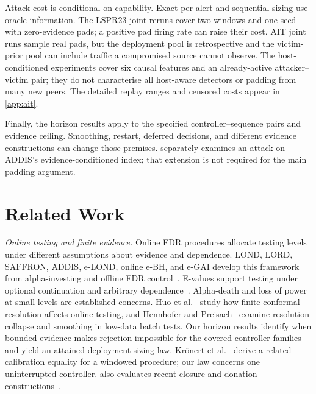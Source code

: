 \documentclass[conference]{IEEEtran}
\begin{document}
Attack cost is conditional on capability. Exact per-alert and sequential sizing use oracle
information. The LSPR23 joint reruns cover two windows and one seed with zero-evidence pads;
a positive pad firing rate can raise their cost. AIT joint runs sample real pads, but the deployment
pool is retrospective and the victim-prior pool can include traffic a compromised source cannot
observe. The host-conditioned experiments cover six causal features and an already-active
attacker--victim pair; they do not characterise all host-aware detectors or padding from many new
peers. The detailed replay ranges and censored costs appear in \cref{app:ait}.

Finally, the horizon results apply to the specified controller--sequence pairs and evidence ceiling.
Smoothing, restart, deferred decisions, and different evidence constructions can change those
premises. \label{sec:stateptr} separately examines an attack on ADDIS's
evidence-conditioned index; that extension is not required for the main padding argument.

\section{Related Work}\label{sec:related}

\emph{Online testing and finite evidence.} Online FDR procedures allocate testing levels under
different assumptions about evidence and dependence. LOND, LORD, SAFFRON, ADDIS, e-LOND, online e-BH,
and e-GAI develop this framework from alpha-investing and offline
FDR control~\cite{foster2008alpha,benjamini1995controlling,javanmard2015lond,javanmard2018lord,ramdas2017lordpp,ramdas2018saffron,tian2019addis,xu2024elond,fischer2025onlineebh,egai2025}.
E-values support testing under optional continuation and arbitrary
dependence~\cite{grunwald2024safe,vovk2021evalues,wang2022evaluebh}.
Alpha-death and loss of power at small levels are established concerns. Huo et
al.~\cite{huo2024realtime} study how finite conformal resolution affects online testing, and
Hennhofer and Preisach~\cite{hennhofer2026resolution} examine resolution collapse and smoothing in
low-data batch tests. Our horizon results identify when bounded evidence makes rejection
impossible for the covered controller families and yield an attained deployment sizing law.
Kr\"onert et al.~\cite{kronert2024fdr} derive a related calibration equality for a windowed
procedure; our law concerns one uninterrupted controller.  also evaluates
recent closure and donation constructions~\cite{xu2026eclosure,xu2025closure}.
\end{document}
